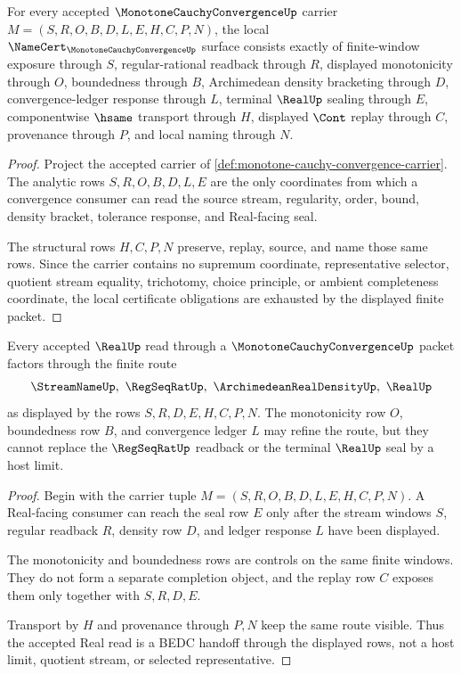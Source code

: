\begin{theorem}
\label{thm:monotone-cauchy-convergence-namecert-obligations}
For every accepted $\MonotoneCauchyConvergenceUp$ carrier $M=(S,R,O,B,D,L,E,H,C,P,N)$, the local $\NameCert_{\MonotoneCauchyConvergenceUp}$ surface consists exactly of finite-window exposure through $S$, regular-rational readback through $R$, displayed monotonicity through $O$, boundedness through $B$, Archimedean density bracketing through $D$, convergence-ledger response through $L$, terminal $\RealUp$ sealing through $E$, componentwise $\hsame$ transport through $H$, displayed $\Cont$ replay through $C$, provenance through $P$, and local naming through $N$.
\end{theorem}
\begin{proof}
Project the accepted carrier of \autoref{def:monotone-cauchy-convergence-carrier}. The analytic rows $S,R,O,B,D,L,E$ are the only coordinates from which a convergence consumer can read the source stream, regularity, order, bound, density bracket, tolerance response, and Real-facing seal.

The structural rows $H,C,P,N$ preserve, replay, source, and name those same rows. Since the carrier contains no supremum coordinate, representative selector, quotient stream equality, trichotomy, choice principle, or ambient completeness coordinate, the local certificate obligations are exhausted by the displayed finite packet.
\end{proof}

\begin{theorem}
\label{thm:monotone-cauchy-convergence-real-seal-route}
Every accepted $\RealUp$ read through a $\MonotoneCauchyConvergenceUp$ packet factors through the finite route
$$
\StreamNameUp,\ \RegSeqRatUp,\ \ArchimedeanRealDensityUp,\ \RealUp
$$
as displayed by the rows $S,R,D,E,H,C,P,N$. The monotonicity row $O$, boundedness row $B$, and convergence ledger $L$ may refine the route, but they cannot replace the $\RegSeqRatUp$ readback or the terminal $\RealUp$ seal by a host limit.
\end{theorem}
\begin{proof}
Begin with the carrier tuple $M=(S,R,O,B,D,L,E,H,C,P,N)$. A Real-facing consumer can reach the seal row $E$ only after the stream windows $S$, regular readback $R$, density row $D$, and ledger response $L$ have been displayed.

The monotonicity and boundedness rows are controls on the same finite windows. They do not form a separate completion object, and the replay row $C$ exposes them only together with $S,R,D,E$.

Transport by $H$ and provenance through $P,N$ keep the same route visible. Thus the accepted Real read is a BEDC handoff through the displayed rows, not a host limit, quotient stream, or selected representative.
\end{proof}

